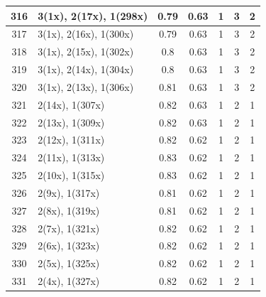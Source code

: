 \begin{small}
\begin{longtable}{|c|p{4cm}|c|c|c|c|c|}
  316 & 3(1x), 2(17x), 1(298x) & \cellcolor{colorBad}  0.79 & \cellcolor{colorBad} 0.63 & 1 & 3 & \cellcolor{colorGood} 2 \\   \hline
  317 & 3(1x), 2(16x), 1(300x) & \cellcolor{colorBad}  0.79 & \cellcolor{colorBad} 0.63 & 1 & 3 & \cellcolor{colorGood} 2 \\   \hline
  318 & 3(1x), 2(15x), 1(302x) & \cellcolor{colorBad}  0.8 & \cellcolor{colorBad} 0.63 & 1 & 3 & \cellcolor{colorGood} 2 \\   \hline
  319 & 3(1x), 2(14x), 1(304x) & \cellcolor{colorBad}  0.8 & \cellcolor{colorBad} 0.63 & 1 & 3 & \cellcolor{colorGood} 2 \\   \hline
  320 & 3(1x), 2(13x), 1(306x) & \cellcolor{colorBad}  0.81 & \cellcolor{colorBad} 0.63 & 1 & 3 & \cellcolor{colorGood} 2 \\   \hline
  321 & 2(14x), 1(307x) & \cellcolor{colorBad}  0.82 & \cellcolor{colorBad} 0.63 & 1 & 2 & \cellcolor{colorGood} 1 \\   \hline
  322 & 2(13x), 1(309x) & \cellcolor{colorBad}  0.82 & \cellcolor{colorBad} 0.63 & 1 & 2 & \cellcolor{colorGood} 1 \\   \hline
  323 & 2(12x), 1(311x) & \cellcolor{colorBad}  0.82 & \cellcolor{colorBad} 0.62 & 1 & 2 & \cellcolor{colorGood} 1 \\   \hline
  324 & 2(11x), 1(313x) & \cellcolor{colorBad}  0.83 & \cellcolor{colorBad} 0.62 & 1 & 2 & \cellcolor{colorGood} 1 \\   \hline
  325 & 2(10x), 1(315x) & \cellcolor{colorBad}  0.83 & \cellcolor{colorBad} 0.62 & 1 & 2 & \cellcolor{colorGood} 1 \\   \hline
  326 & 2(9x), 1(317x) & \cellcolor{colorBad}  0.81 & \cellcolor{colorBad} 0.62 & 1 & 2 & \cellcolor{colorGood} 1 \\   \hline
  327 & 2(8x), 1(319x) & \cellcolor{colorBad}  0.81 & \cellcolor{colorBad} 0.62 & 1 & 2 & \cellcolor{colorGood} 1 \\   \hline
  328 & 2(7x), 1(321x) & \cellcolor{colorBad}  0.82 & \cellcolor{colorBad} 0.62 & 1 & 2 & \cellcolor{colorGood} 1 \\   \hline
  329 & 2(6x), 1(323x) & \cellcolor{colorBad}  0.82 & \cellcolor{colorBad} 0.62 & 1 & 2 & \cellcolor{colorGood} 1 \\   \hline
  330 & 2(5x), 1(325x) & \cellcolor{colorBad}  0.82 & \cellcolor{colorBad} 0.62 & 1 & 2 & \cellcolor{colorGood} 1 \\   \hline
  331 & 2(4x), 1(327x) & \cellcolor{colorBad}  0.82 & \cellcolor{colorBad} 0.62 & 1 & 2 & \cellcolor{colorGood} 1 \\   \hline

\end{longtable}
\end{small}
